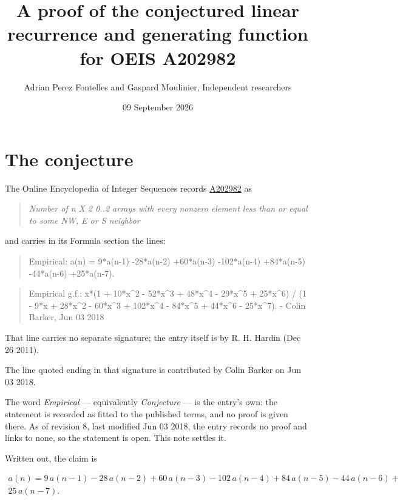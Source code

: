 \documentclass[11pt]{article}
\title{A proof of the conjectured linear recurrence and generating function for OEIS A202982}
\author{Adrian Perez Fontelles and Gaspard Moulinier, Independent researchers}
\date{09 September 2026}
\theoremstyle{definition}
\begin{document}
\maketitle
\section{The conjecture}

The Online Encyclopedia of Integer Sequences records \href{https://oeis.org/A202982}{A202982} as

\begin{quote}\itshape Number of n X 2 0..2 arrays with every nonzero element less than or equal to some NW, E or S neighbor\end{quote}

and carries in its Formula section the lines:

\begin{quote}\ttfamily Empirical: a(n) = 9*a(n-1) -28*a(n-2) +60*a(n-3) -102*a(n-4) +84*a(n-5) -44*a(n-6) +25*a(n-7).\end{quote}

\begin{quote}\ttfamily Empirical g.f.: x*(1 + 10*x\textasciicircum{}2 - 52*x\textasciicircum{}3 + 48*x\textasciicircum{}4 - 29*x\textasciicircum{}5 + 25*x\textasciicircum{}6) / (1 - 9*x + 28*x\textasciicircum{}2 - 60*x\textasciicircum{}3 + 102*x\textasciicircum{}4 - 84*x\textasciicircum{}5 + 44*x\textasciicircum{}6 - 25*x\textasciicircum{}7). - Colin Barker, Jun 03 2018\end{quote}

That line carries no separate signature; the entry itself is by R. H. Hardin (Dec 26 2011).

The line quoted ending in that signature is contributed by Colin Barker on Jun 03 2018.

The word {\itshape Empirical} --- equivalently {\itshape Conjecture} --- is the entry's own: the statement is recorded as fitted to the published terms, and no proof is given there. As of revision 8, last modified Jun 03 2018, the entry records no proof and links to none, so the statement is open. This note settles it.

Written out, the claim is

\begin{multline*} a(n) = 9\,a(n-1) - 28\,a(n-2) + 60\,a(n-3) - 102\,a(n-4) + 84\,a(n-5) - 44\,a(n-6) + \\ 25\,a(n-7). \end{multline*}
\end{document}
